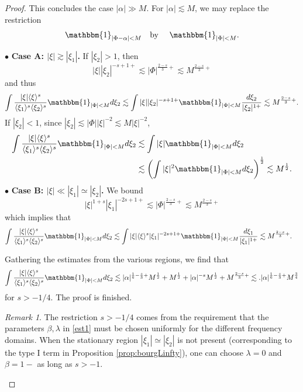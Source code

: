 \documentclass[%
11pt,  reqno]{amsart}
\newcommand{\fia}{\mathbbm{1}_{|\Phi-\alpha|<M}}
\newcommand{\jap}[1]{\langle #1 \rangle}
\newcommand{\5}{\textup{V}}
\newcommand{\noi}{\noindent}
\newcommand{\les}{\lesssim}
\theoremstyle{remark}
\newtheorem{remark}[theorem]{Remark}
\newcommand{\bul}{\bullet}
\numberwithin{equation}{section}
\numberwithin{theorem}{section}
\begin{document}
\begin{proof}
This concludes the case $|\alpha|\gg M$. For $|\alpha|\lesssim M$, we may replace the restriction
$$
\fia \quad \mbox{by }\quad \mathbbm{1}_{|\Phi|<M}.
$$

\noi
$\bul$ 
\textbf{Case A: $|\xi|\gtrsim |\xi_1|$.} If $|\xi_2|>1$, then
$$
|\xi||\xi_2|^{-s+1+}\lesssim |\Phi|^{\frac{2-s}{3}+} \lesssim M^{\frac{2-s}{3}+}
$$
and thus
\begin{align}
\int \frac{|\xi|\jap{\xi}^s}{\jap{\xi_1}^s\jap{\xi_2}^s}\mathbbm{1}_{|\Phi|<M} d\xi_2 \les \int |\xi||\xi_2|^{-s+1+}\mathbbm{1}_{|\Phi|<M}\frac{d\xi_2}{|\xi_2|^{1+}}\lesssim M^{\frac{2-s}{3}+}.
\end{align}
If $|\xi_2|<1$, since $|\xi_2|\lesssim |\Phi||\xi|^{-2}\lesssim M|\xi|^{-2}$,
\begin{align}
\int \frac{|\xi|\jap{\xi}^s}{\jap{\xi_1}^s\jap{\xi_2}^s}\mathbbm{1}_{|\Phi|<M} d\xi_2 &\les \int |\xi|\mathbbm{1}_{|\Phi|<M}d\xi_2\\&\lesssim \left(\int |\xi|^2\mathbbm{1}_{|\Phi|<M} d\xi_2\right)^\frac12\lesssim M^{\frac12}.
\end{align}
\smallskip\noi
$\bul$ 
\textbf{Case B: $|\xi|\ll |\xi_1|\simeq |\xi_2|$.} We bound
\begin{equation}\label{eq:estbm1}
    |\xi|^{1+s}|\xi_1|^{-2s+1+}\lesssim |\Phi|^{\frac{2-s}{3}+}\lesssim M^{\frac{2-s}{3}+}
\end{equation}
which implies that
\begin{align}
\int \frac{|\xi|\jap{\xi}^s}{\jap{\xi_1}^s\jap{\xi_2}^s}\mathbbm{1}_{|\Phi|<M} d\xi_2 &\les \int |\xi|\jap{\xi}^s|\xi_1|^{-2s+1+}\mathbbm{1}_{|\Phi|<M}\frac{d\xi_1}{|\xi_1|^{1+}}\lesssim  M^{\frac{2-s}{3}+}.
\end{align}

\medskip

Gathering the estimates from the various regions, we find that
\begin{align}
\int \frac{|\xi|\jap{\xi}^s}{\jap{\xi_1}^s\jap{\xi_2}^s}\mathbbm{1}_{|\Phi|<M} d\xi_2 \lesssim |\alpha|^{\frac16-\frac s3+}M^{\frac12} + M^{\frac12} + |\alpha|^{-s}M^{\frac12} +  M^{\frac{2-s}{3}+} \lesssim .|\alpha|^{\frac16-\frac s3+}M^{\frac34}
\end{align}
for $s>-1/4$. The proof is finished.

\begin{remark}
    The restriction $s>-1/4$ comes from the requirement that the parameters $\beta,\lambda$ in \eqref{est1} must be chosen uniformly for the different frequency domains. When the stationary region $|\xi_1|\simeq |\xi_2|$ is not present (corresponding to the type I term in Proposition \ref{prop:bourgLinfty}), one can choose $\lambda=0$ and $\beta=1-$ as long as $s>-1$.


\end{remark}
\end{proof}
\end{document}
